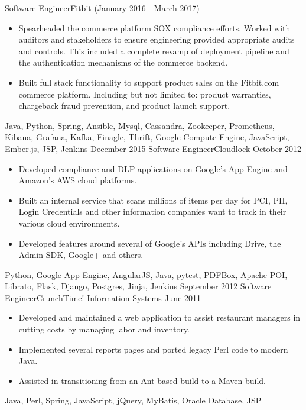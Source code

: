 \begin{experiences}
{\begin{itemize}
                      \end{itemize}
                  }
                  {}
   \experience
  {}  {Software Engineer}{Fitbit {\footnotesize (January 2016 - March 2017)}}
  {}   {
                      \begin{itemize}
                        \item Spearheaded the commerce platform SOX compliance efforts. Worked with auditors and stakeholders to ensure engineering provided appropriate audits and controls. This included a complete revamp of deployment pipeline and the authentication mechanisms of the commerce backend.
                        \item Built full stack functionality to support product sales on the Fitbit.com commerce platform. Including but not limited to: product warranties, chargeback fraud prevention, and product launch support.
                      \end{itemize}
                  }
                  {Java, Python, Spring, Ansible, Mysql, Cassandra, Zookeeper, Prometheus, Kibana, Grafana, Kafka, Finagle, Thrift, Google Compute Engine, JavaScript, Ember.js, JSP, Jenkins}
\emptySeparator
  \experience
  {December 2015}  {Software Engineer}{Cloudlock}
  {October 2012}   {
                      \begin{itemize}
                        \item Developed compliance and DLP applications on Google's App Engine and Amazon's AWS cloud platforms.
                        \item Built an internal service that scans millions of items per day for PCI, PII, Login Credentials and other information companies want to track in their various cloud environments.
                        \item Developed features around several of Google's APIs including Drive, the Admin SDK, Google+ and others.
                      \end{itemize}
                  }
                  {Python, Google App Engine, AngularJS, Java, pytest, PDFBox, Apache POI, Librato, Flask, Django, Postgres, Jinja, Jenkins}
\emptySeparator
  \experience
  {September 2012}  {Software Engineer}{CrunchTime! Information Systems}
  {June 2011}   {
                      \begin{itemize}
                        \item Developed and maintained a web application to assist restaurant managers in cutting costs by managing labor and inventory.
                        \item Implemented several reports pages and ported legacy Perl code to modern Java.   
                        \item Assisted in transitioning from an Ant based build to a Maven build.
                      \end{itemize}
                  }
                  {Java, Perl, Spring, JavaScript, jQuery, MyBatis, Oracle Database, JSP}
\end{experiences}
